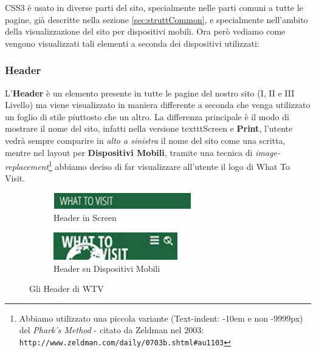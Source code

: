 CSS3 è usato in diverse parti del sito, specialmente nelle parti comuni a tutte le pagine, già descritte nella sezione \ref{sec:struttCommon}, e specialmente nell'ambito della visualizzazione del sito per dispositivi mobili. Ora però vediamo come vengono visualizzati tali elementi a seconda dei dispositivi utilizzati:

\subsubsection{Header}\label{sec:Pres-Header}
L'\textbf{Header} è un elemento presente in tutte le pagine del nostro sito
(I, II e III Livello) ma viene visualizzato in maniera differente a seconda
che venga utilizzato un foglio di stile piuttosto che un altro. La differenza
principale è il modo di mostrare il nome del sito, infatti nella versione 
texttt{Screen} e \textbf{Print}, l'utente vedrà sempre comparire in
\textit{alto a sinistra} il nome del sito come una scritta, mentre nel layout
per \textbf{Dispositivi Mobili}, tramite una tecnica di
\textit{image-replacement}\footnote{Abbiamo utilizzato una piccola variante
(Text-indent: -10em e non -9999px) del \textit{Phark's Method} - citato da
Zeldman nel 2003: \texttt{http://www.zeldman.com/daily/0703b.shtml\#au1103}} abbiamo
deciso di far visualizzare all'utente il logo di What To Visit.
\begin{figure}[h!]
  \centering
  \begin{subfigure}[b]{0.3\textwidth}
    \includegraphics[height=0.7cm,width=6cm]{images/pres_header.jpg}
    \caption{Header in Screen}
    \label{fig:Header-screen}
  \end{subfigure}
  \hspace{3cm}
  \begin{subfigure}[b]{0.3\textwidth}
    \includegraphics[height=1.2cm,width=5.4cm]{images/pres_header_m.jpg}
    \caption{Header su Dispositivi Mobili}
    \label{fig:Header-mobile}
  \end{subfigure}
  \caption{Gli Header di WTV}\label{fig:Display-Header}
\end{figure}

